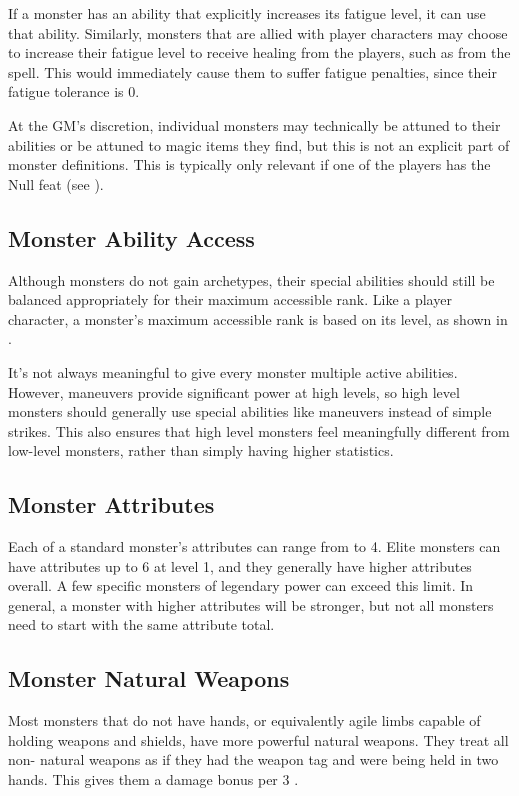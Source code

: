     If a monster has an ability that explicitly increases its fatigue level, it can use that ability.
    Similarly, monsters that are allied with player characters may choose to increase their fatigue level to receive healing from the players, such as from the  spell.
    This would immediately cause them to suffer fatigue penalties, since their fatigue tolerance is 0.

    At the GM's discretion, individual monsters may technically be attuned to their abilities or be attuned to magic items they find, but this is not an explicit part of monster definitions.
    This is typically only relevant if one of the players has the Null feat (see ).

  \subsection{Monster Ability Access}\label{Monster Ability Access}
    Although monsters do not gain archetypes, their special abilities should still be balanced appropriately for their maximum accessible rank.
    Like a player character, a monster's maximum accessible rank is based on its level, as shown in .

    It's not always meaningful to give every monster multiple active abilities.
    However, maneuvers provide significant power at high levels, so high level monsters should generally use special abilities like maneuvers instead of simple strikes.
    This also ensures that high level monsters feel meaningfully different from low-level monsters, rather than simply having higher statistics.

  \subsection{Monster Attributes}\label{Monster Attributes}
    Each of a standard monster's attributes can range from  to 4.
    Elite monsters can have attributes up to 6 at level 1, and they generally have higher attributes overall.
    A few specific monsters of legendary power can exceed this limit.
    In general, a monster with higher attributes will be stronger, but not all monsters need to start with the same attribute total.

  \subsection{Monster Natural Weapons}\label{Monster Natural Weapon}
    Most monsters that do not have hands, or equivalently agile limbs capable of holding weapons and shields, have more powerful natural weapons.
    They treat all non- natural weapons as if they had the  weapon tag and were being held in two hands.
    This gives them a  damage bonus per 3 .

